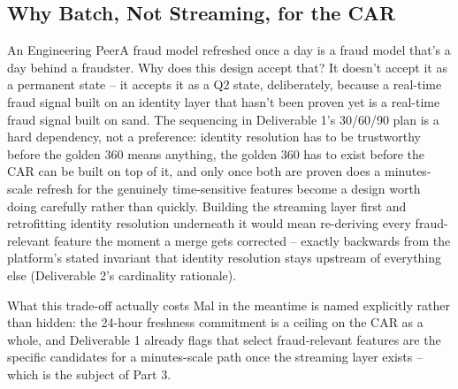 \documentclass[11pt]{article}
\begin{document}
\subsection{Why Batch, Not Streaming, for the CAR}
\begin{stakeholderq}{An Engineering Peer}{A fraud model refreshed once a day is a fraud model that's a day behind a fraudster. Why does this design accept that?}
It doesn't accept it as a permanent state -- it accepts it as a Q2 state, deliberately, because a real-time fraud signal built on an identity layer that hasn't been proven yet is a real-time fraud signal built on sand. The sequencing in Deliverable 1's 30/60/90 plan is a hard dependency, not a preference: identity resolution has to be trustworthy before the golden 360 means anything, the golden 360 has to exist before the CAR can be built on top of it, and only once both are proven does a minutes-scale refresh for the genuinely time-sensitive features become a design worth doing carefully rather than quickly. Building the streaming layer first and retrofitting identity resolution underneath it would mean re-deriving every fraud-relevant feature the moment a merge gets corrected -- exactly backwards from the platform's stated invariant that identity resolution stays upstream of everything else (Deliverable 2's cardinality rationale).

What this trade-off actually costs Mal in the meantime is named explicitly rather than hidden: the 24-hour freshness commitment is a ceiling on the CAR as a whole, and Deliverable 1 already flags that select fraud-relevant features are the specific candidates for a minutes-scale path once the streaming layer exists -- which is the subject of Part 3.
\end{stakeholderq}
\end{document}
